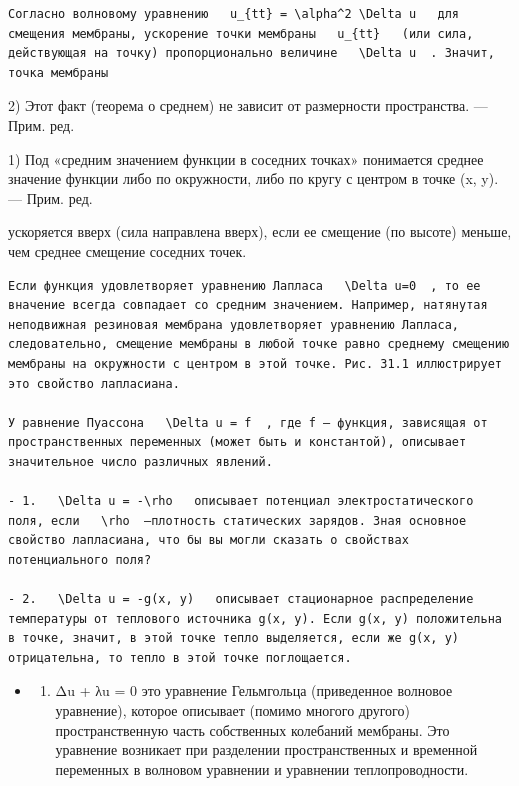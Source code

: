 \documentclass[
]{article}
\providecommand{\tightlist}{%
  \setlength{\itemsep}{0pt}\setlength{\parskip}{0pt}}
\begin{document}
{{{\begin{verbatim}
Согласно волновому уравнению   u_{tt} = \alpha^2 \Delta u   для смещения мембраны, ускорение точки мембраны   u_{tt}   (или сила, действующая на точку) пропорционально величине   \Delta u  . Значит, точка мембраны
\end{verbatim}

2) Этот факт (теорема о среднем) не зависит от размерности пространства.
--- Прим. ред.

1) Под «средним значением функции в соседних точках» понимается среднее
значение функции либо по окружности, либо по кругу с центром в точке (x,
y). --- Прим. ред.

ускоряется вверх (сила направлена вверх), если ее смещение (по высоте)
меньше, чем среднее смещение соседних точек.

\begin{verbatim}
Если функция удовлетворяет уравнению Лапласа   \Delta u=0  , то ее вначение всегда совпадает со средним значением. Например, натянутая неподвижная резиновая мембрана удовлетворяет уравнению Лапласа, следовательно, смещение мембраны в любой точке равно среднему смещению мембраны на окружности с центром в этой точке. Рис. 31.1 иллюстрирует это свойство лапласиана.

У равнение Пуассона   \Delta u = f  , где f — функция, зависящая от пространственных переменных (может быть и константой), описывает значительное число различных явлений.

- 1.   \Delta u = -\rho   описывает потенциал электростатического поля, если   \rho  —плотность статических зарядов. Зная основное свойство лапласиана, что бы вы могли сказать о свойствах потенциального поля?

- 2.   \Delta u = -g(x, y)   описывает стационарное распределение температуры от теплового источника g(x, y). Если g(x, y) положительна в точке, значит, в этой точке тепло выделяется, если же g(x, y) отрицательна, то тепло в этой точке поглощается.
\end{verbatim}

\begin{itemize}
\tightlist
\item
  \begin{enumerate}
  \def\labelenumi{\arabic{enumi}.}
  \setcounter{enumi}{2}
  \tightlist
  \item
    Δu + λu = 0 это уравнение Гельмгольца (приведенное волновое
    уравнение), которое описывает (помимо многого другого)
    пространственную часть собственных колебаний мембраны. Это уравнение
    возникает при разделении пространственных и временной переменных в
    волновом уравнении и уравнении теплопроводности.
  \end{enumerate}
\end{itemize}

}}}
\end{document}
